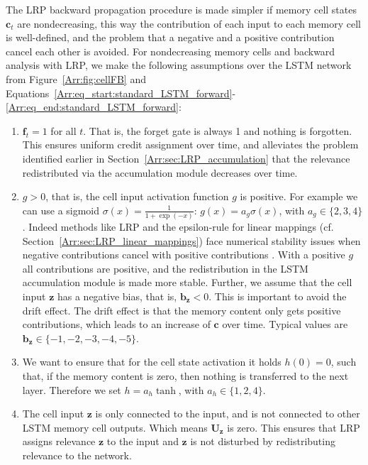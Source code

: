 \documentclass[runningheads]{llncs}
\newcommand\Bb{\bm{b}}%
\newcommand\Bc{\bm{c}}%
\newcommand\Bf{\bm{f}}%
\newcommand\Bz{\bm{z}}%
\newcommand\BU{\bm{U}}%
\begin{document}
The LRP backward propagation procedure is made simpler if memory cell states $\Bc_t$ are nondecreasing,
this way the contribution of each input to each memory cell
is well-defined, and the problem that a 
negative and a positive contribution cancel each other is avoided. 
For nondecreasing memory cells 
and backward analysis with LRP, 
we make the following assumptions over the LSTM network from Figure~\ref{Arr:fig:cellFB} and Equations~\ref{Arr:eq_start:standard_LSTM_forward}-\ref{Arr:eq_end:standard_LSTM_forward}:
\begin{enumerate}[label=\textbf{(A\arabic*)}]
\item $\Bf_t=1$ for all $t$. That is, the forget gate is always 1 and
  nothing is forgotten. This ensures uniform credit assignment over time,
  and alleviates the problem identified earlier in Section~\ref{Arr:sec:LRP_accumulation}
  that the relevance redistributed via the accumulation module decreases over time.

\item $g>0$, that is, the cell input activation function $g$ is positive. For example we can use a sigmoid
  $\sigma(x)= \frac{1}{1+\exp(-x)}$: $g(x)=a_g \sigma(x)$, with
  $a_g \in \{2,3,4\}$.
  Indeed methods like LRP and the epsilon-rule for linear mappings (cf. Section~\ref{Arr:sec:LRP_linear_mappings}) face numerical stability issues when negative contributions
  cancel with positive contributions \cite{Arr:Montavon:DSP18}.
  With a positive $g$ all
  contributions are positive, and the redistribution in the LSTM accumulation module is made more stable.
  Further, we assume that the cell input $\Bz$ has a negative bias, that is,
  $\Bb_{\Bz}<0$. This is important to avoid the drift effect.
  The drift effect is that the memory content only gets positive
  contributions, which leads to an increase of $\Bc$ over time.
  Typical values are $\Bb_{\Bz} \in \{-1,-2,-3,-4,-5\}$.

\item We want to ensure that for the cell state activation it holds $h(0)=0$, such that, if the memory content is zero,
  then nothing is transferred to the next layer.
  Therefore we set $h=a_h \tanh$, with $a_h \in \{1,2,4\}$.

\item The cell input $\Bz$ is only connected to the input, and is not connected
  to other LSTM memory cell outputs.  Which means $\BU_{\Bz}$ is zero. This ensures
  that LRP assigns relevance $\Bz$ to the input and $\Bz$ is not
  disturbed by redistributing relevance to the network.


\end{enumerate}
\end{document}
